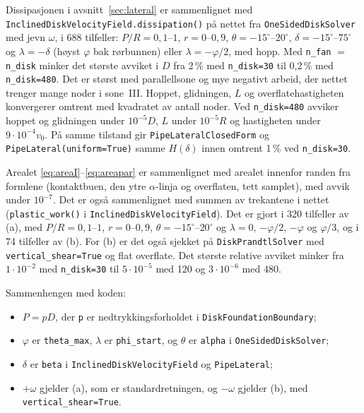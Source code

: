 \documentclass[11pt,a4paper]{article}
\begin{document}
Dissipasjonen i avsnitt~\ref{sec:lateral} er sammenlignet med
\texttt{InclinedDiskVelocityField.dissipation()} på nettet fra
\texttt{OneSidedDiskSolver} med jevn $\omega$, i 688 tilfeller:
$P/R = 0{,}1$--$1$, $r = 0$--$0{,}9$, $\theta = -15^\circ$--$20^\circ$,
$\delta = -15^\circ$--$75^\circ$ og $\lambda = -\delta$ (høyst $\varphi$ bak
rørbunnen) eller $\lambda = -\varphi/2$, med hopp.  Med
\texttt{n\_fan} $=$ \texttt{n\_disk} minker det største avviket i $D$ fra
2\,\% med \texttt{n\_disk=30} til 0,2\,\% med \texttt{n\_disk=480}.  Det er
størst med parallellsone og mye negativt arbeid, der nettet trenger mange
noder i sone~III.  Hoppet, glidningen, $L$ og overflatehastigheten
konvergerer omtrent med kvadratet av antall noder.  Ved
\texttt{n\_disk=480} avviker hoppet og glidningen under $10^{-5}D$, $L$ under
$10^{-5}R$ og hastigheten under $9\cdot10^{-4}v_0$.
På samme tilstand gir \texttt{PipeLateralClosedForm} og
\texttt{PipeLateral(uniform=True)} samme $H(\delta)$ innen omtrent 1\,\% ved
\texttt{n\_disk=30}.

Arealet \eqref{eq:areaI}--\eqref{eq:areapar} er sammenlignet med arealet
innenfor randen fra formlene (kontaktbuen, den ytre $\alpha$-linja og
overflaten, tett samplet), med avvik under $10^{-7}$.  Det er også
sammenlignet med summen av trekantene i nettet (\texttt{plastic\_work()} i
\texttt{InclinedDiskVelocityField}).  Det er gjort i 320 tilfeller av (a),
med $P/R = 0{,}1$--$1$, $r = 0$--$0{,}9$, $\theta = -15^\circ$--$20^\circ$ og
$\lambda = 0$, $-\varphi/2$, $-\varphi$ og $\varphi/3$, og i 74 tilfeller av
(b).  For (b) er det også sjekket på \texttt{DiskPrandtlSolver} med
\texttt{vertical\_shear=True} og flat overflate.  Det største relative
avviket minker fra $1\cdot10^{-2}$ med \texttt{n\_disk=30} til
$5\cdot10^{-5}$ med 120 og $3\cdot10^{-6}$ med 480.

Sammenhengen med koden:
\begin{itemize}
  \item $P = pD$, der \texttt{p} er nedtrykkingsforholdet i
        \texttt{DiskFoundationBoundary};
  \item $\varphi$ er \texttt{theta\_max}, $\lambda$ er \texttt{phi\_start},
        og $\theta$ er \texttt{alpha} i \texttt{OneSidedDiskSolver};
  \item $\delta$ er \texttt{beta} i \texttt{InclinedDiskVelocityField} og
        \texttt{PipeLateral};
  \item $+\omega$ gjelder (a), som er standardretningen, og $-\omega$
        gjelder (b), med \texttt{vertical\_shear=True}.
\end{itemize}
\end{document}

